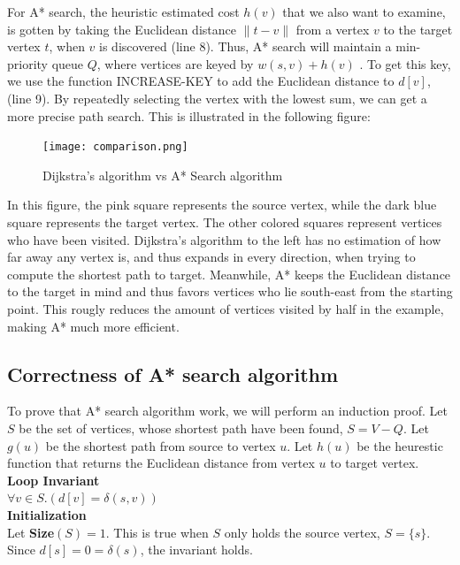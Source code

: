 \documentclass[11pt]{article}
\begin{document}
\noindent  For A* search, the heuristic estimated cost $h(v)$ that we also want to examine, is gotten by taking the Euclidean distance  $\|t-v\|$ from a vertex $v$ to the target vertex $t$,  when $v$ is discovered (line 8). Thus, A* search will maintain a min-priority queue $Q$, where vertices are keyed by $w(s,v)+h(v)$ . To get this key, we use the function INCREASE-KEY to add the Euclidean distance to $d[v]$, (line 9). By repeatedly selecting the vertex with the lowest sum, we can get a more precise path search. This is illustrated in the following figure:\\

\begin{figure}[H]
\centering
\texttt{[image: comparison.png]}
\caption[]{Dijkstra's algorithm  vs  A* Search algorithm\footnotemark}
\end{figure}

\noindent In this figure, the pink square represents the source vertex, while the dark blue square represents the target vertex. The other colored squares represent vertices who have been visited. Dijkstra's algorithm to the left has no estimation of how far away any vertex is, and thus expands in every direction, when trying to compute the shortest path to target. Meanwhile, A* keeps the Euclidean distance to the target in mind and thus favors vertices who lie south-east from the starting point. This rougly reduces the amount of vertices visited by half in the example, making A* much more efficient. 



\subsection{Correctness of A* search algorithm}
To prove that A* search algorithm work, we will perform an induction proof. Let $S$ be the set of vertices, whose shortest path have been found, $S=V-Q$. Let $g(u)$ be the shortest path from source to vertex $u$. Let $h(u)$ be the heurestic function that returns the Euclidean distance from vertex $u$ to target vertex.\\

\noindent \textbf{Loop Invariant}\\
$\forall v\in S.(d[v] = \delta(s,v))$\\

\noindent \textbf{Initialization}\\
Let \textbf{Size}$(S)=1$. This is true when $S$ only holds the source vertex, $S = \{s\}$. Since $d[s]=0=\delta(s)$, the invariant holds.\\
\end{document}
